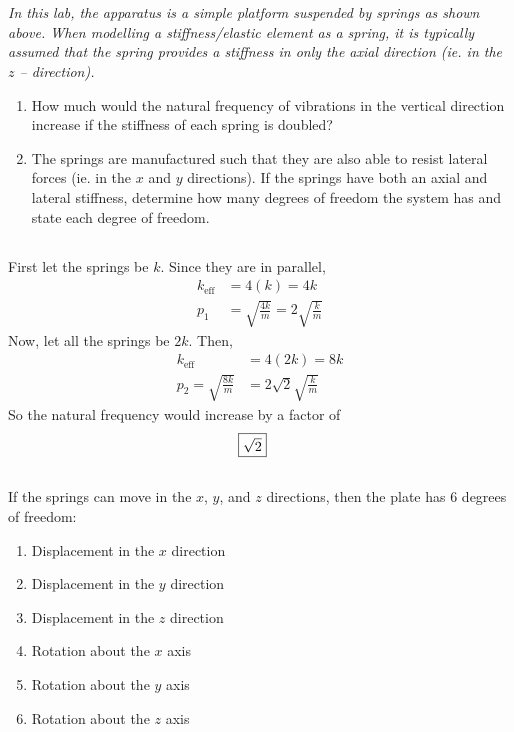 \section{}
\textit{In this lab, the apparatus is a simple platform suspended by springs as shown above. When modelling a stiffness/elastic element as a spring, it is typically assumed that the spring provides a stiffness in only the axial direction (ie. in the $z$ – direction).}

\begin{enumerate}[label=(\alph*)]
    \item How much would the natural frequency of vibrations in the vertical direction increase if the stiffness of each spring is doubled?
    \item The springs are manufactured such that they are also able to resist lateral forces (ie. in the $x$ and $y$ directions). If the springs have both an axial and lateral stiffness, determine how many degrees of freedom the system has and state each degree of freedom.
\end{enumerate}
\subsection{}
First let the springs be $k$. Since they are in parallel,
\begin{align*}
    k_{\text{eff}} &= 4(k) = 4k \\
    p_1 &= \sqrt{\frac{4k}{m}} = 2\sqrt{\frac{k}{m}}
\end{align*}
Now, let all the springs be $2k$. Then,
\begin{align*}
    k_{\text{eff}} &= 4(2k) = 8k \\
    p_2 = \sqrt{\frac{8k}{m}} &= 2\sqrt{2}\sqrt{\frac{k}{m}}
\end{align*}
So the natural frequency would increase by a factor of 
\begin{align*}
    \Aboxed{\sqrt{2}}
\end{align*}

\subsection{}
If the springs can move in the $x$, $y$, and $z$ directions, then the plate has 6 degrees of freedom:
\begin{enumerate}
    \item Displacement in the $x$ direction
    \item Displacement in the $y$ direction
    \item Displacement in the $z$ direction
    \item Rotation about the $x$ axis
    \item Rotation about the $y$ axis
    \item Rotation about the $z$ axis
\end{enumerate}